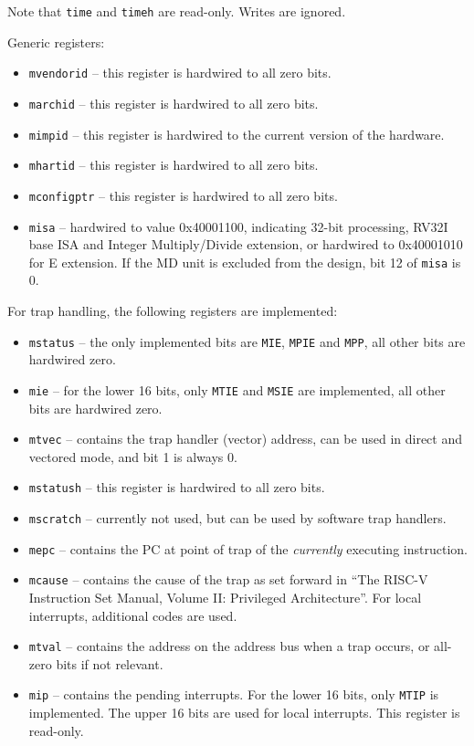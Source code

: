 \documentclass[12pt]{article}
\begin{document}
Note that \lstinline|time| and \lstinline|timeh| are read-only. Writes are ignored. 

Generic registers:

\begin{itemize}
\item \lstinline|mvendorid| -- this register is hardwired to all zero bits.
\item \lstinline|marchid| -- this register is hardwired to all zero bits.
\item \lstinline|mimpid| -- this register is hardwired to the current version of the hardware.
\item \lstinline|mhartid| -- this register is hardwired to all zero bits.
\item \lstinline|mconfigptr| -- this register is hardwired to all zero bits.
\item \lstinline|misa| -- hardwired to value 0x40001100, indicating 32-bit processing, RV32I base ISA and Integer Multiply/Divide extension, or hardwired to 0x40001010 for E extension. If the MD unit is excluded from the design, bit 12 of \lstinline|misa| is 0.
\end{itemize}

For trap handling, the following registers are implemented:

\begin{itemize}
\item \lstinline|mstatus| -- the only implemented bits are \lstinline|MIE|, \lstinline|MPIE| and \lstinline|MPP|, all other bits are hardwired zero.
\item \lstinline|mie| -- for the lower 16 bits, only \lstinline|MTIE| and \lstinline|MSIE| are implemented, all other bits are hardwired zero.
\item \lstinline|mtvec| -- contains the trap handler (vector) address, can be used in direct and vectored mode, and bit 1 is always 0.
\item \lstinline|mstatush| -- this register is hardwired to all zero bits.
\item \lstinline|mscratch| -- currently not used, but can be used by software trap handlers.
\item \lstinline|mepc| -- contains the PC at point of trap of the \emph{currently} executing instruction.
\item \lstinline|mcause| -- contains the cause of the trap as set forward in ``The RISC-V Instruction Set Manual, Volume II: Privileged Architecture''. For local interrupts, additional codes are used.
\item \lstinline|mtval| -- contains the address on the address bus when a trap occurs, or all-zero bits if not relevant.
\item \lstinline|mip| -- contains the pending interrupts. For the lower 16 bits, only \lstinline|MTIP| is implemented. The upper 16 bits are used for local interrupts. This register is read-only.
\end{itemize}
\end{document}

